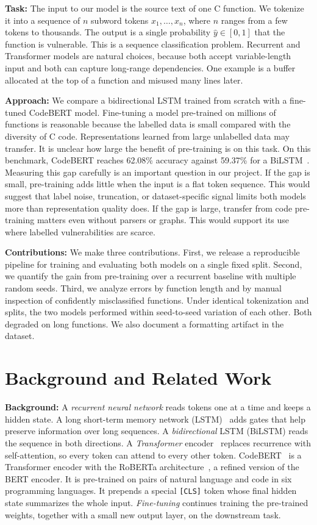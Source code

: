 \documentclass{article}
\begin{document}
\textbf{Task:}
The input to our model is the source text of one C function. We tokenize it into a sequence of $n$ subword tokens $x_1,\dots,x_n$, where $n$ ranges from a few tokens to thousands.
The output is a single probability $\hat{y}\in[0,1]$ that the function is vulnerable.
This is a sequence classification problem. Recurrent and Transformer models are natural choices, because both accept variable-length input and both can capture long-range dependencies. One example is a buffer allocated at the top of a function and misused many lines later.

\textbf{Approach:}
We compare a bidirectional LSTM trained from scratch with a fine-tuned CodeBERT model.
Fine-tuning a model pre-trained on millions of functions is reasonable because the labelled data is small compared with the diversity of C code. Representations learned from large unlabelled data may transfer.
It is unclear how large the benefit of pre-training is on this task. On this benchmark, CodeBERT reaches 62.08\% accuracy against 59.37\% for a BiLSTM~\citep{lu2021codexglue}. Measuring this gap carefully is an important question in our project.
If the gap is small, pre-training adds little when the input is a flat token sequence. This would suggest that label noise, truncation, or dataset-specific signal limits both models more than representation quality does.
If the gap is large, transfer from code pre-training matters even without parsers or graphs. This would support its use where labelled vulnerabilities are scarce.

\textbf{Contributions:}
We make three contributions. First, we release a reproducible pipeline for training and evaluating both models on a single fixed split. Second, we quantify the gain from pre-training over a recurrent baseline with multiple random seeds. Third, we analyze errors by function length and by manual inspection of confidently misclassified functions.
Under identical tokenization and splits, the two models performed within seed-to-seed variation of each other. Both degraded on long functions. We also document a formatting artifact in the dataset.

\section{Background and Related Work}

\textbf{Background:}
A \emph{recurrent neural network} reads tokens one at a time and keeps a hidden state. A long short-term memory network (LSTM)~\citep{hochreiter1997lstm} adds gates that help preserve information over long sequences. A \emph{bidirectional} LSTM (BiLSTM) reads the sequence in both directions.
A \emph{Transformer} encoder~\citep{vaswani2017attention} replaces recurrence with self-attention, so every token can attend to every other token.
CodeBERT~\citep{feng2020codebert} is a Transformer encoder with the RoBERTa architecture~\citep{liu2019roberta}, a refined version of the BERT encoder. It is pre-trained on pairs of natural language and code in six programming languages. It prepends a special \texttt{[CLS]} token whose final hidden state summarizes the whole input.
\emph{Fine-tuning} continues training the pre-trained weights, together with a small new output layer, on the downstream task.
\end{document}
